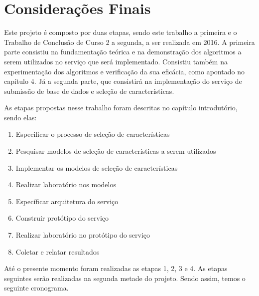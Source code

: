\chapter[Considerações Finais]{Considerações Finais}

Este projeto é composto por duas etapas, sendo este trabalho a primeira e o Trabalho de Conclusão de Curso 2 a segunda, a ser realizada em 2016. A primeira parte consistiu na fundamentação teórica e na demonstração dos algoritmos a serem utilizados no serviço que será implementado. Consistiu também na experimentação dos algoritmos e verificação da sua eficácia, como apontado no capítulo 4. Já a segunda parte, que consistirá na implementação do serviço de submissão de base de dados e seleção de características. 

As etapas propostas nesse trabalho foram descritas no capítulo introdutório, sendo elas:

\begin{enumerate}
	\item{Especificar o processo de seleção de características}
	\item{Pesquisar modelos de seleção de características a serem utilizados}
	\item{Implementar os modelos de seleção de características}
	\item{Realizar laboratório nos modelos}
	\item{Específicar arquitetura do serviço}
	\item{Construir protótipo do serviço}
	\item{Realizar laboratório no protótipo do serviço}
	\item{Coletar e relatar resultados}
\end{enumerate}

Até o presente momento foram realizadas as etapas 1, 2, 3 e 4. As etapas seguintes serão realizadas na segunda metade do projeto. Sendo assim, temos o seguinte cronograma.

